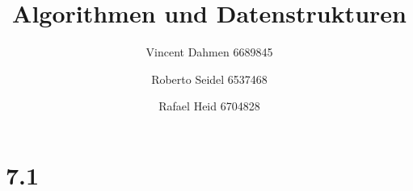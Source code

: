 \documentclass[12pt,a4paper]{article}
\title{Algorithmen und Datenstrukturen}
\author{Vincent Dahmen 6689845 \and Roberto Seidel 6537468 \and Rafael Heid 6704828}
\begin{document}
\maketitle{}


\section*{7.1}





\end{document}
